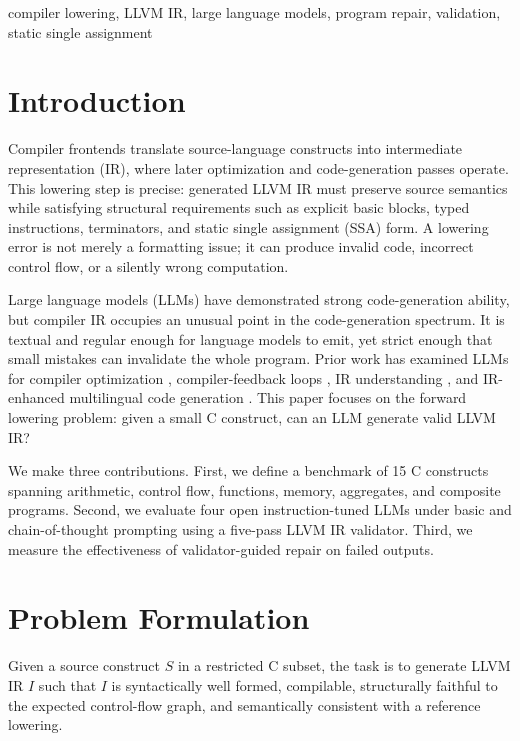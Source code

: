 \documentclass[conference]{IEEEtran}
\begin{document}
\begin{IEEEkeywords}
compiler lowering, LLVM IR, large language models, program repair, validation, static single assignment
\end{IEEEkeywords}

\section{Introduction}
Compiler frontends translate source-language constructs into intermediate representation (IR), where later optimization and code-generation passes operate. This lowering step is precise: generated LLVM IR must preserve source semantics while satisfying structural requirements such as explicit basic blocks, typed instructions, terminators, and static single assignment (SSA) form. A lowering error is not merely a formatting issue; it can produce invalid code, incorrect control flow, or a silently wrong computation.

Large language models (LLMs) have demonstrated strong code-generation ability, but compiler IR occupies an unusual point in the code-generation spectrum. It is textual and regular enough for language models to emit, yet strict enough that small mistakes can invalidate the whole program. Prior work has examined LLMs for compiler optimization \cite{cummins2023compiler}, compiler-feedback loops \cite{grubisic2024feedback}, IR understanding \cite{jiang2025ir}, and IR-enhanced multilingual code generation \cite{paul2024ircoder}. This paper focuses on the forward lowering problem: given a small C construct, can an LLM generate valid LLVM IR?

We make three contributions. First, we define a benchmark of 15 C constructs spanning arithmetic, control flow, functions, memory, aggregates, and composite programs. Second, we evaluate four open instruction-tuned LLMs under basic and chain-of-thought prompting using a five-pass LLVM IR validator. Third, we measure the effectiveness of validator-guided repair on failed outputs.

\section{Problem Formulation}
Given a source construct $S$ in a restricted C subset, the task is to generate LLVM IR $I$ such that $I$ is syntactically well formed, compilable, structurally faithful to the expected control-flow graph, and semantically consistent with a reference lowering.
\end{document}
